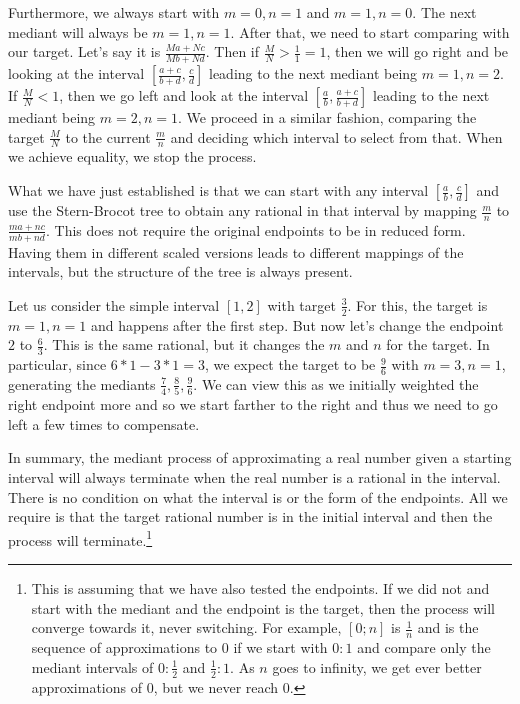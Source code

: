 \documentclass[12pt]{article}
\theoremstyle{remark}
\begin{document}
Furthermore, we always start with $m=0, n=1$ and $m=1, n=0$. The next mediant will always be $m=1, n=1$. After that, we need to start comparing with our target. Let's say it is $\frac{Ma + Nc}{Mb + Nd}$. Then if $\frac{M}{N} > \frac{1}{1} = 1$, then we will go right and be looking at the interval $[\frac{a+c}{b+d}, \frac{c}{d}]$ leading to the next mediant being $m=1, n=2$. If $\frac{M}{N} < 1$, then we go left and look at the interval $[\frac{a}{b}, \frac{a+c}{b+d}]$ leading to the next mediant being $m=2, n=1$. We proceed in a similar fashion, comparing the target $\frac{M}{N}$ to the current $\frac{m}{n}$ and deciding which interval to select from that. When we achieve equality, we stop the process.

What we have just established is that we can start with any interval $[\frac{a}{b}, \frac{c}{d}]$ and use the Stern-Brocot tree to obtain any rational in that interval by mapping $\frac{m}{n}$ to $\frac{ma + nc}{mb + nd}$. This does not require the original endpoints to be in reduced form. Having them in different scaled versions leads to different mappings of the intervals, but the structure of the tree is always present. 

Let us consider the simple interval $[1, 2]$ with target $\frac{3}{2}$. For this, the target is $m=1, n=1$ and happens after the first step. But now let's change the endpoint $2$ to $\frac{6}{3}$. This is the same rational, but it changes the $m$ and $n$ for the target. In particular, since $6*1-3*1 = 3$, we expect the target to be $\frac{9}{6}$ with $m=3, n=1$, generating the mediants $\frac{7}{4}, \frac{8}{5}, \frac{9}{6}$.  We can view this as we initially weighted the right endpoint more and so we start farther to the right and thus we need to go left a few times to compensate. 

In summary, the mediant process of approximating a real number given a starting interval will always terminate when the real number is a rational in the interval. There is no condition on what the interval is or the form of the endpoints. All we require is that the target rational number is in the initial interval and then the process will terminate.\footnote{This is assuming that we have also tested the endpoints. If we did not and start with the mediant and the endpoint is the target, then the process will converge towards it, never switching. For example, $[0; n]$ is $\frac{1}{n}$ and is the sequence of approximations to $0$ if we start with $0:1$ and compare only the mediant intervals of $0:\frac{1}{2}$ and $\frac{1}{2}:1$. As $n$ goes to infinity, we get ever better approximations of $0$, but we never reach $0$.}



\medskip

\printbibliography
\end{document}
